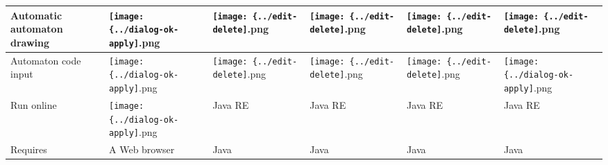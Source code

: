 \begin{tabularx}{\linewidth}{|*{6}{X|}}
\hline
 Automatic automaton drawing  &  \texttt{[image: \{../dialog-ok-apply]}.png}            &  \texttt{[image: \{../edit-delete]}.png}     &  \texttt{[image: \{../edit-delete]}.png}      &  \texttt{[image: \{../edit-delete]}.png}                        &  \texttt{[image: \{../edit-delete]}.png}\tabularnewline
\hline
 Automaton code input         &  \texttt{[image: \{../dialog-ok-apply]}.png}            &  \texttt{[image: \{../edit-delete]}.png}     &  \texttt{[image: \{../edit-delete]}.png}      &  \texttt{[image: \{../edit-delete]}.png}                        &  \texttt{[image: \{../dialog-ok-apply]}.png}\tabularnewline
\hline
 Run online                   &  \texttt{[image: \{../dialog-ok-apply]}.png}            &  Java RE  &  Java RE  &  Java RE  &  Java RE\tabularnewline
\hline
 Requires                     &  A Web browser  &  Java   &  Java    &  Java                      &  Java\tabularnewline
\hline
\end{tabularx}

